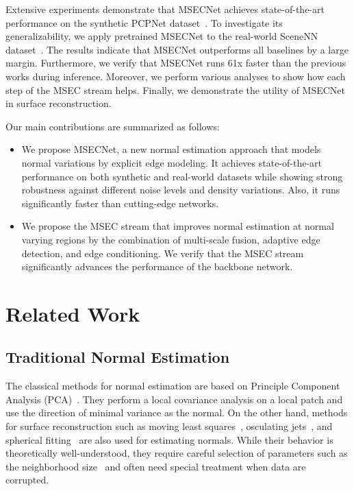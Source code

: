 \documentclass[sigconf]{acmart}
\begin{document}
Extensive experiments demonstrate that MSECNet achieves state-of-the-art performance on the synthetic PCPNet dataset~\cite{guerrero2018pcpnet}. To investigate its generalizability, we apply pretrained MSECNet to the real-world SceneNN dataset~\cite{hua2016scenenn}. The results indicate that MSECNet outperforms all baselines by a large margin. 
Furthermore, we verify that MSECNet runs 61x faster than the previous works during inference. Moreover, we perform various analyses to show how each step of the MSEC stream helps. Finally, we demonstrate the utility of MSECNet in surface reconstruction.  

Our main contributions are summarized as follows:
\begin{itemize}
    \item We propose MSECNet, a new normal estimation approach that models normal variations by explicit edge modeling. 
It achieves state-of-the-art performance on both synthetic and real-world datasets while showing strong robustness against different noise levels and density variations. Also, it runs significantly faster than cutting-edge networks.      
    \item We propose the MSEC stream that improves normal estimation at normal varying regions by the combination of multi-scale fusion, adaptive edge detection, and edge conditioning. We verify that the MSEC stream significantly advances the performance of the backbone network. 
\end{itemize}



\section{Related Work}

\subsection{Traditional Normal Estimation}
The classical methods for normal estimation are based on Principle Component Analysis (PCA)~\cite{hoppe1992surface,dey2006normal,alliez2007voronoi}. They perform a local covariance analysis on a local patch and use the direction of minimal variance as the normal. 
On the other hand, methods for surface reconstruction such as moving least squares~\cite{lancaster1981surfaces,alexa2001point}, osculating jets~\cite{cazals2005estimating},
and spherical fitting~\cite{guennebaud2007algebraic}
are also used for estimating normals. 
While their behavior is theoretically well-understood, they require careful selection of parameters such as the neighborhood size~\cite{mitra2003estimating} and often need special treatment when data are corrupted.
\end{document}
